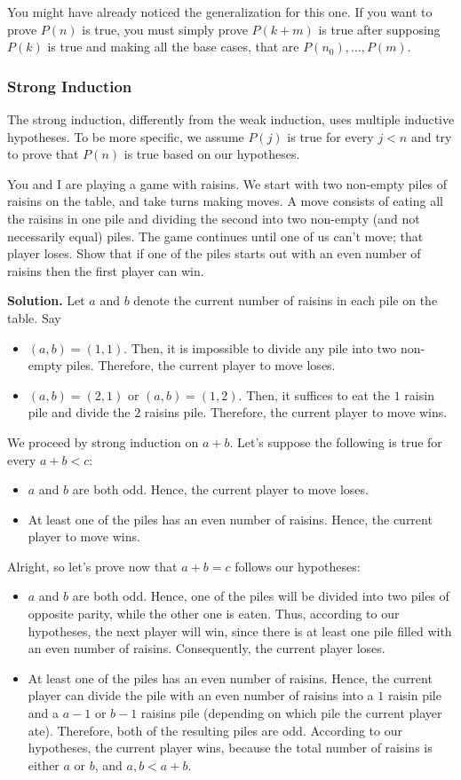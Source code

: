 You might have already noticed the generalization for this one. If you want to prove $P(n)$ is true, you must simply prove
$P(k+m)$ is true after supposing $P(k)$ is true and making all the base cases, that are $P(n_0),\dots, P(m)$.
\subsubsection{Strong Induction}
The strong induction, differently from the weak induction, uses multiple inductive hypotheses. To be more specific,
we assume $P(j)$ is true for every $j<n$ and try to prove that $P(n)$ is true based on our hypotheses.
\begin{example}{}{}\label{exa:strong}
	You and I are playing a game with raisins. We start with two non-empty piles of raisins
	on the table, and take turns making moves. A move consists of eating all the raisins in one pile and
	dividing the second into two non-empty (and not necessarily equal) piles. The game continues until
	one of us can’t move; that player loses. Show that if one of the piles starts out with an even number
	of raisins then the first player can win.
\end{example}
\textcolor{color2}{\textbf{Solution. }}
Let $a$ and $b$ denote the current number of raisins in each pile on the table. Say
\begin{itemize}
	\item $(a,b)=(1,1)$. Then, it is impossible to divide any pile into two non-empty piles. Therefore, the current player to move loses.
	\item $(a,b)=(2,1)$ or $(a,b)=(1,2)$. Then, it suffices to eat the $1$ raisin pile and divide the $2$ raisins pile. Therefore, the
	      current player to move wins.
\end{itemize}
We proceed by strong induction on $a+b$. Let's suppose the following is true for every $a+b<c$:
\begin{itemize}
	\item $a$ and $b$ are both odd. Hence, the current player to move loses.
	\item At least one of the piles has an even number of raisins. Hence, the current player to move wins.
\end{itemize}
Alright, so let's prove now that $a+b=c$ follows our hypotheses:
\begin{itemize}
	\item $a$ and $b$ are both odd. Hence, one of the piles will be divided into two piles of opposite parity, while the other one is eaten.
	      Thus, according to our hypotheses, the next player will win, since there is at least one pile filled with an even number of raisins.
	      Consequently, the current player loses.

	\item At least one of the piles has an even number of raisins. Hence, the current player can divide the pile with an even number of raisins
	      into a $1$ raisin pile and a $a-1$ or $b-1$ raisins pile (depending on which pile the current player ate). Therefore,
	      both of the resulting piles are odd. According to our hypotheses, the current player wins, because the total number of raisins is either
	      $a$ or $b$, and $a,b<a+b$.
\end{itemize}
